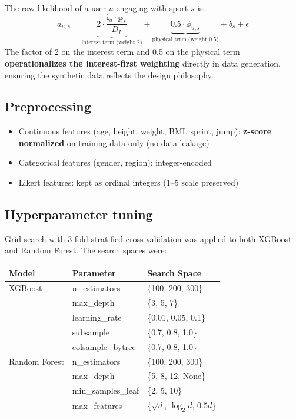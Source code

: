 \documentclass[12pt,a4paper]{article}
\begin{document}
The raw likelihood of a user $u$ engaging with sport $s$ is:
\[
a_{u,s} = \underbrace{2 \cdot \frac{\mathbf{i}_u \cdot \mathbf{p}_s}{D_I}}_{\text{interest term (weight 2)}}
         + \underbrace{0.5 \cdot \phi_{u,s}}_{\text{physical term (weight 0.5)}}
         + b_s + \epsilon
\]
The factor of 2 on the interest term and 0.5 on the physical term
\textbf{operationalizes the interest-first weighting} directly in data
generation, ensuring the synthetic data reflects the design philosophy.

\subsection{Preprocessing}

\begin{itemize}
\item Continuous features (age, height, weight, BMI, sprint, jump):
      \textbf{z-score normalized} on training data only (no data leakage)
\item Categorical features (gender, region): integer-encoded
\item Likert features: kept as ordinal integers (1--5 scale preserved)
\end{itemize}

\subsection{Hyperparameter tuning}

Grid search with 3-fold stratified cross-validation was applied to both
XGBoost and Random Forest. The search spaces were:

\begin{center}
\begin{tabular}{lll}
\toprule
\textbf{Model} & \textbf{Parameter} & \textbf{Search Space} \\
\midrule
XGBoost & n\_estimators & \{100, 200, 300\} \\
        & max\_depth & \{3, 5, 7\} \\
        & learning\_rate & \{0.01, 0.05, 0.1\} \\
        & subsample & \{0.7, 0.8, 1.0\} \\
        & colsample\_bytree & \{0.7, 0.8, 1.0\} \\
\midrule
Random Forest & n\_estimators & \{100, 200, 300\} \\
              & max\_depth & \{5, 8, 12, None\} \\
              & min\_samples\_leaf & \{2, 5, 10\} \\
              & max\_features & \{$\sqrt{d}$, $\log_2 d$, $0.5d$\} \\
\bottomrule
\end{tabular}
\end{center}
\end{document}
